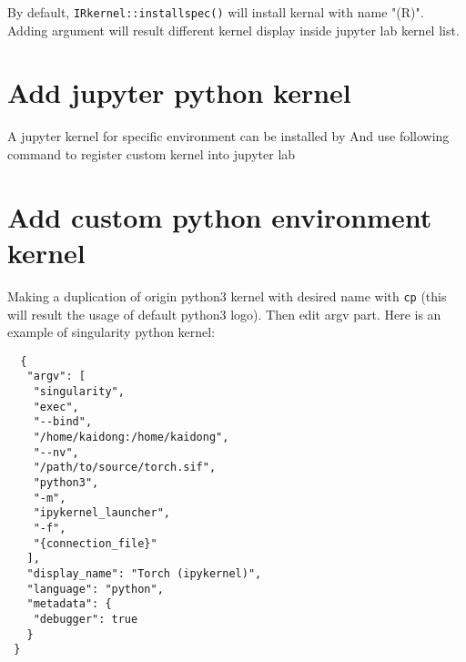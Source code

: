 By default, \texttt{IRkernel::installspec()} will install kernal with 
name "\rm(R)". Adding argument will result different kernel display inside 
jupyter lab kernel list.

\section{Add jupyter python kernel}

A jupyter kernel for specific environment can be installed by 
And use following command to register custom kernel into jupyter lab 

\section{Add custom python environment kernel}

Making a duplication of origin python3 kernel with desired name with 
\texttt{cp} (this will result the usage of default python3 logo).  
Then edit argv part. Here is an example of singularity python kernel:

\begin{verbatim}
  {
   "argv": [
    "singularity",
    "exec",
    "--bind",
    "/home/kaidong:/home/kaidong",
    "--nv",
    "/path/to/source/torch.sif",
    "python3",
    "-m",
    "ipykernel_launcher",
    "-f",
    "{connection_file}"
   ],
   "display_name": "Torch (ipykernel)",
   "language": "python",
   "metadata": {
    "debugger": true
   }
 }
\end{verbatim}
